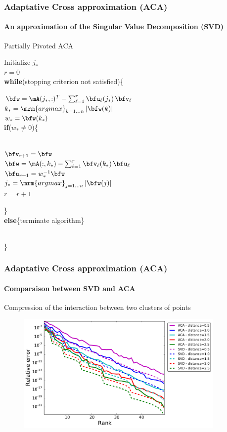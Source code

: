 
\begin{frame}
\frametitle{Adaptative Cross approximation (ACA)}
\framesubtitle{An approximation of the Singular Value Decomposition (SVD)} 
\begin{algorithm}[H]
  \caption{Partially Pivoted ACA}  
  \label{AlgoACA}
  Initialize $j_{*}$\\
  $r=0$\\
  \textbf{while}(stopping criterion not satisfied)\{\\
  \indent\hspace{0.5cm} \parbox{\linewidth}{
    $\bfw = \mA(j_{*},:)^{T} - \sum_{\ell=1}^{r}\bfu_{\ell}(j_{*})\,\bfv_{\ell}$\\
    $k_{*} = \mathop{\mrm{argmax}}_{k = 1\dots n}\vert \bfw(k)\vert$\\
    $w_{*} = \bfw(k_{*})$\\
    \textbf{if}($w_{*}\neq 0$)\{\\\quad\\
    \indent\hspace{0.5cm} \parbox{\linewidth}{
      $\bfv_{r+1} = \bfw$\\
      $\bfw = \mA(:,k_{*})-\sum_{\ell = 1}^{r}\bfv_{\ell}(k_{*})\,\bfu_{\ell} $\\
      $\bfu_{r+1} = w_{*}^{-1}\bfw$\\      
      $j_{*} = \mathop{\mrm{argmax}}_{j = 1\dots n} \vert \bfw(j)\vert$\\
      $r=r+1$
    }
   \}\\
    \textbf{else}\{terminate algorithm\}
    }\\
  \}

\end{algorithm}

\end{frame}


\begin{frame}
\frametitle{Adaptative Cross approximation (ACA)}
\framesubtitle{Comparaison between SVD and ACA} 
Compression of the interaction between two clusters of points
\begin{figure}
	\centering 
	\includegraphics[width=0.9\textwidth]{../images/graphe_output_err_decrease}
\end{figure}


\end{frame}

